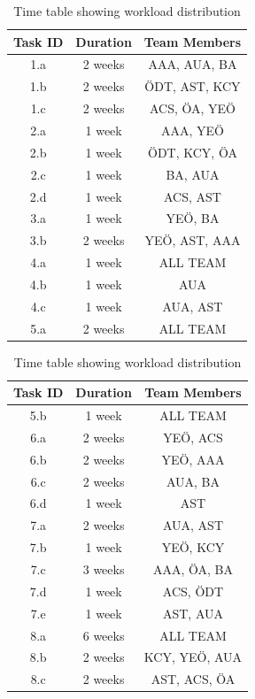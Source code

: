 \documentclass[12pt]{article}
\begin{document}
\begin{table}[h!]
\centering
\begin{minipage}{0.45\textwidth}
    \centering
    \scriptsize
    \begin{tabular}{|c|c|c|}
    \hline
    \textbf{Task ID} & \textbf{Duration} & \textbf{Team Members} \\
    \hline
    1.a & 2 weeks & AAA, AUA, BA \\
    1.b & 2 weeks & ÖDT, AST, KCY \\
    1.c & 2 weeks & ACS, ÖA, YEÖ \\
    2.a & 1 week & AAA, YEÖ \\
    2.b & 1 week & ÖDT, KCY, ÖA \\
    2.c & 1 week & BA, AUA \\
    2.d & 1 week & ACS, AST \\
    3.a & 1 week & YEÖ, BA \\
    3.b & 2 weeks & YEÖ, AST, AAA \\
    4.a & 1 week & ALL TEAM \\
    4.b & 1 week & AUA \\
    4.c & 1 week & AUA, AST \\
    5.a & 2 weeks & ALL TEAM \\
    \hline
    \end{tabular}
\end{minipage}%
\hfill
\begin{minipage}{0.45\textwidth}
    \centering
    \scriptsize
    \begin{tabular}{|c|c|c|}
    \hline
    \textbf{Task ID} & \textbf{Duration} & \textbf{Team Members} \\
    \hline
    5.b & 1 week & ALL TEAM \\
    6.a & 2 weeks & YEÖ, ACS \\
    6.b & 2 weeks & YEÖ, AAA \\
    6.c & 2 weeks & AUA, BA \\
    6.d & 1 week & AST \\
    7.a & 2 weeks & AUA, AST \\
    7.b & 1 week & YEÖ, KCY \\
    7.c & 3 weeks & AAA, ÖA, BA \\
    7.d & 1 week & ACS, ÖDT \\
    7.e & 1 week & AST, AUA \\
    8.a & 6 weeks & ALL TEAM \\
    8.b & 2 weeks & KCY, YEÖ, AUA \\
    8.c & 2 weeks & AST, ACS, ÖA \\
    \hline
    \end{tabular}
\end{minipage}
    \caption{Time table showing workload distribution}
\end{table}
\end{document}
